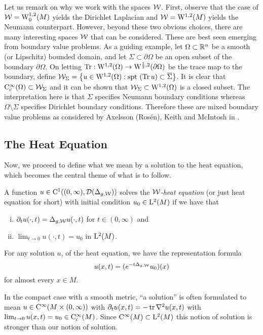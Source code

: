 \documentclass[a4paper, 12pt]{amsart}
\begin{document}
Let us remark on why we work with the spaces \(\cW\). First, observe that the case of $\cW = \SobH[0]{1}(M)$
yields the Dirichlet Laplacian
and $\cW = \SobH{1}(M)$ yields the Neumann counterpart.
However, beyond these two obvious choices, 
there are many interesting spaces $\cW$ that
can be considered. These are best
seen emerging from boundary value problems.
As a guiding example, let $\Omega \subset \R^n$
be a smooth (or Lipschitz) bounded domain, and let $\Sigma \subset \partial \Omega$
be an open subset of the boundary $\partial \Omega$.
On letting $\Tr: \SobH{1}(\Omega) \to \SobH{\frac{1}{2}}(\partial \Omega)$
be the trace map to the boundary, define 
$\cW_{\Sigma} = \set{u \in \SobH{1}(\Omega): \spt (\Tr u) \subset \close{\Sigma}}$. 
It is clear that $\Ck[c]{\infty}(\Omega) \subset \cW_{\Sigma}$ and
it can be shown that $\cW_{\Sigma} \subset \SobH{1}(\Omega)$
is a closed subset. 
The interpretation here is that $\Sigma$ specifies Neumann boundary conditions whereas $\Omega \setminus \Sigma$
specifies Dirichlet boundary conditions. Therefore
these are mixed boundary value problems as considered
by  Axelsson (Rosén), Keith and McIntosh in \cite{AKM2}.

\subsection{The Heat Equation}

Now, we proceed to define what we mean by a solution to the heat
equation, which becomes the central theme of what is to follow.

\begin{defn}
A function \(u \in \Ck{1}((0,\infty),  \dom(\Delta_{g,\cW}))\) solves the \emph{\(\cW\)-heat equation} (or just heat equation for short) with initial condition $u_0 \in \Lp{2}(M)$ if we have that
\begin{enumerate}[(i)]
\item  $\partial_t u (\cdot, t) = \Delta_{g,\cW} u(\cdot, t)$ for $t \in (0, \infty)$ and 
\item $\lim_{t \to 0} u(\cdot, t) = u_0$ in $\Lp{2}(M)$.
\end{enumerate}
\end{defn}

For any solution \(u\), of the heat equation, we have the representation formula
\[
u(x,t) = (e^{-t \Delta_{g,\cW}}u_0)(x)
\]
for almost every $x \in M$.
 
\begin{rem}
In the compact case with a smooth metric, ``a solution'' is often formulated to mean $u \in \Ck{\infty}( M \times (0, \infty))$
with $\partial_t u(x,t) = -\tr \nabla^2 u(x,t)$ with 
$\lim_{t \to 0} u(x,t) = u_0 \in \Ck[c]{\infty}(M)$.
Since $\Ck{\infty}(M) \subset \Lp{2}(M)$ this notion of solution is stronger than our notion of solution.
\end{rem}
\end{document}
